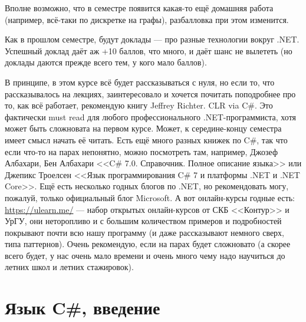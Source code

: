 \documentclass[a5paper]{article}
\begin{document}
Вполне возможно, что в семестре появится какая-то ещё домашняя работа (например, всё-таки по дискретке на графы), разбалловка при этом изменится.

Как в прошлом семестре, будут доклады --- про разные технологии вокруг .NET. Успешный доклад даёт аж +10 баллов, что много, и даёт шанс не вылететь (но доклады даются прежде всего тем, у кого мало баллов).

В принципе, в этом курсе всё будет рассказываться с нуля, но если то, что рассказывалось на лекциях, заинтересовало и хочется почитать поподробнее про то, как всё работает, рекомендую книгу Jeffrey Richter. CLR via C\#. Это фактически must read для любого профессионального .NET-программиста, хотя может быть сложновата на первом курсе. Может, к середине-концу семестра имеет смысл начать её читать. Есть ещё много разных книжек по C\#, так что если что-то на парах непонятно, можно посмотреть там, например, Джозеф Албахари, Бен Албахари <<C\# 7.0. Справочник. Полное описание языка>> или Джепикс Троелсен <<Язык программирования C\# 7 и платформы .NET и .NET Core>>. Ещё есть несколько годных блогов по .NET, но рекомендовать могу, пожалуй, только официальный блог Microsoft. А вот онлайн-курсы годные есть: \url{https://ulearn.me/} --- набор открытых онлайн-курсов от СКБ <<Контур>> и УрГУ, они неторопливо и с большим количеством примеров и подробностей покрывают почти всю нашу программу (и даже рассказывают немного сверх, типа паттернов). Очень рекомендую, если на парах будет сложновато (а скорее всего будет, у нас очень мало времени и очень много чему надо научиться до летних школ и летних стажировок).

\section{Язык C\#, введение}
\end{document}
